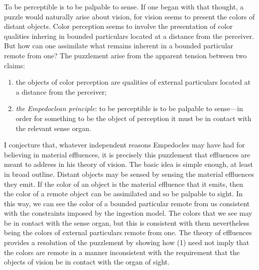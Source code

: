 To be perceptible is to be palpable to sense. If one began with that thought, a puzzle would naturally arise about vision, for vision seems to present the colors of distant objects. Color perception seems to involve the presentation of color qualities inhering in bounded particulars located at a distance from the perceiver. But how can one assimilate what remains inherent in a bounded particular remote from one? The puzzlement arise from the apparent tension between two claims:
\begin{enumerate}[(1)]
    \item the objects of color perception are qualities of external particulars located at a distance from the perceiver;
    \item \emph{the Empedoclean principle}: to be perceptible is to be palpable to sense---in order for something to be the object of perception it must be in contact with the relevant sense organ.
\end{enumerate}
I conjecture that, whatever independent reasons Empedocles may have had for believing in material effluences, it is precisely this puzzlement that effluences are meant to address in his theory of vision. The basic idea is simple enough, at least in broad outline. Distant objects may be sensed by sensing the material effluences they emit. If the color of an object is the material effluence that it emits, then the color of a remote object can be assimilated and so be palpable to sight. In this way, we can see the color of a bounded particular remote from us  consistent with the constraints imposed by the ingestion model. The colors that we see may be in contact with the sense organ, but this is consistent with them nevertheless being the colors of external particulars remote from one. The theory of effluences provides a resolution of the puzzlement by showing how (1) need not imply that the colors are remote in a manner inconsistent with the requirement that the objects of vision be in contact with the organ of sight.


